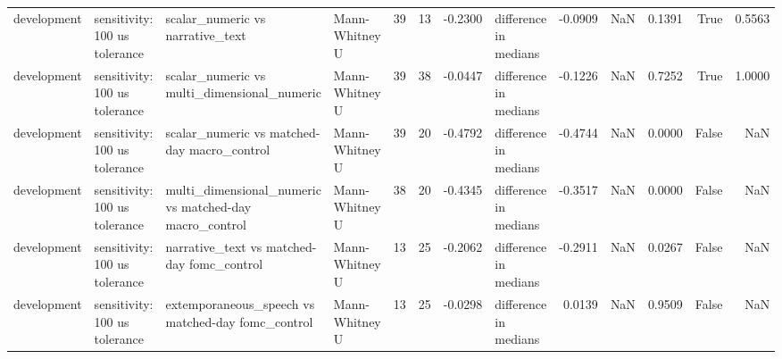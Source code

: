 \begin{tabular}{llllrrrlrrrrr}
development & sensitivity: 100 us tolerance & scalar_numeric vs narrative_text & Mann-Whitney U & 39 & 13 & -0.2300 & difference in medians & -0.0909 & NaN & 0.1391 & True & 0.5563 \\
development & sensitivity: 100 us tolerance & scalar_numeric vs multi_dimensional_numeric & Mann-Whitney U & 39 & 38 & -0.0447 & difference in medians & -0.1226 & NaN & 0.7252 & True & 1.0000 \\
development & sensitivity: 100 us tolerance & scalar_numeric vs matched-day macro_control & Mann-Whitney U & 39 & 20 & -0.4792 & difference in medians & -0.4744 & NaN & 0.0000 & False & NaN \\
development & sensitivity: 100 us tolerance & multi_dimensional_numeric vs matched-day macro_control & Mann-Whitney U & 38 & 20 & -0.4345 & difference in medians & -0.3517 & NaN & 0.0000 & False & NaN \\
development & sensitivity: 100 us tolerance & narrative_text vs matched-day fomc_control & Mann-Whitney U & 13 & 25 & -0.2062 & difference in medians & -0.2911 & NaN & 0.0267 & False & NaN \\
development & sensitivity: 100 us tolerance & extemporaneous_speech vs matched-day fomc_control & Mann-Whitney U & 13 & 25 & -0.0298 & difference in medians & 0.0139 & NaN & 0.9509 & False & NaN \\
\bottomrule
\end{tabular}
